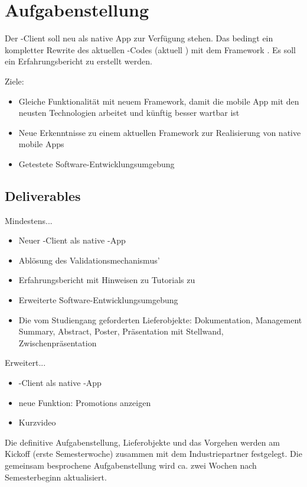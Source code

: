 \chapter*{Aufgabenstellung}
\thispagestyle{scrheadings}

Der \kort{}-Client soll neu als native  App zur Verfügung stehen. Das bedingt ein kompletter Rewrite des aktuellen -Codes (aktuell ) mit dem \gls{Framework} . Es soll ein Erfahrungsbericht zu  erstellt werden.

Ziele:
\begin{itemize}
	\item Gleiche Funktionalität mit neuem Framework, damit die mobile App mit den neusten Technologien arbeitet und künftig besser wartbar ist
	\item Neue Erkenntnisse zu einem aktuellen Framework zur Realisierung von native mobile
Apps 
	\item Getestete Software-Entwicklungsumgebung
\end{itemize}

\section*{Deliverables}
Mindestens...
\begin{itemize}
	\item Neuer \kort{}-Client als native -App
	\item Ablösung des Validationsmechanismus'
	\item Erfahrungsbericht mit Hinweisen zu Tutorials zu 
	\item Erweiterte Software-Entwicklungsumgebung
	\item Die vom Studiengang geforderten Lieferobjekte: Dokumentation, Management Summary, Abstract, Poster, Präsentation mit Stellwand, Zwischenpräsentation
\end{itemize}

Erweitert...
\begin{itemize}
	\item \kort{}-Client als native -App
	\item neue Funktion: Promotions anzeigen
	\item Kurzvideo
\end{itemize}

Die definitive Aufgabenstellung, Lieferobjekte und das Vorgehen werden am Kickoff (erste Semesterwoche) zusammen mit dem Industriepartner festgelegt. Die gemeinsam besprochene Aufgabenstellung wird ca. zwei Wochen nach Semesterbeginn aktualisiert.


